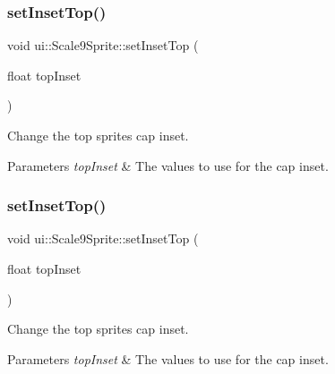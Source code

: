 \subsubsection{\texorpdfstring{set\+Inset\+Top()}{setInsetTop()}\hspace{0.1cm}{\footnotesize\ttfamily [1/2]}}
{\footnotesize\ttfamily void ui\+::\+Scale9\+Sprite\+::set\+Inset\+Top (\begin{DoxyParamCaption}\item[{float}]{top\+Inset }\end{DoxyParamCaption})}



Change the top sprite\textquotesingle{}s cap inset. 


\begin{DoxyParams}{Parameters}
{\em top\+Inset} & The values to use for the cap inset. \\
\hline
\end{DoxyParams}
\mbox{\label{classui_1_1Scale9Sprite_a451123a4d8cd3c734aecdce03ad59ae0}} 
\subsubsection{\texorpdfstring{set\+Inset\+Top()}{setInsetTop()}\hspace{0.1cm}{\footnotesize\ttfamily [2/2]}}
{\footnotesize\ttfamily void ui\+::\+Scale9\+Sprite\+::set\+Inset\+Top (\begin{DoxyParamCaption}\item[{float}]{top\+Inset }\end{DoxyParamCaption})}



Change the top sprite\textquotesingle{}s cap inset. 


\begin{DoxyParams}{Parameters}
{\em top\+Inset} & The values to use for the cap inset. \\
\hline
\end{DoxyParams}
\mbox{\label{classui_1_1Scale9Sprite_a9e5d4a2ad1a4caa99335029fb7d17762}} 
